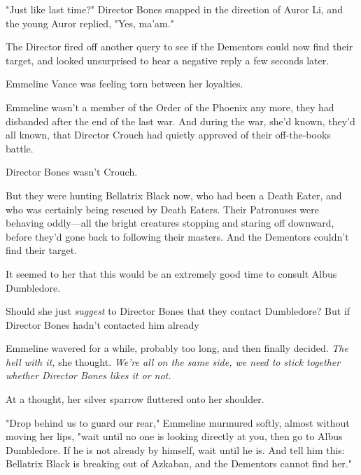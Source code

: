 "Just like last time?" Director Bones snapped in the direction of Auror Li, and
the young Auror replied, "Yes, ma'am."

The Director fired off another query to see if the Dementors could now find
their target, and looked unsurprised to hear a negative reply a few seconds
later.

Emmeline Vance was feeling torn between her loyalties.

Emmeline wasn't a member of the Order of the Phoenix any more, they had
disbanded after the end of the last war. And during the war, she'd known,
they'd all known, that Director Crouch had quietly approved of their
off-the-books battle.

Director Bones wasn't Crouch.

But they were hunting Bellatrix Black now, who had been a Death Eater, and who
was certainly being rescued by Death Eaters. Their Patronuses were behaving
oddly—all the bright creatures stopping and staring off downward, before
they'd gone back to following their masters. And the Dementors couldn't find
their target.

It seemed to her that this would be an extremely good time to consult Albus
Dumbledore.

Should she just \emph{suggest} to Director Bones that they contact Dumbledore?
But if Director Bones hadn't contacted him already{\el}

Emmeline wavered for a while, probably too long, and then finally decided.
\emph{The hell with it,} she thought. \emph{We're all on the same side, we need
to stick together whether Director Bones likes it or not.}

At a thought, her silver sparrow fluttered onto her shoulder.

"Drop behind us to guard our rear," Emmeline murmured softly, almost without
moving her lips, "wait until no one is looking directly at you, then go to
Albus Dumbledore. If he is not already by himself, wait until he is. And tell
him this: Bellatrix Black is breaking out of Azkaban, and the Dementors cannot
find her."
